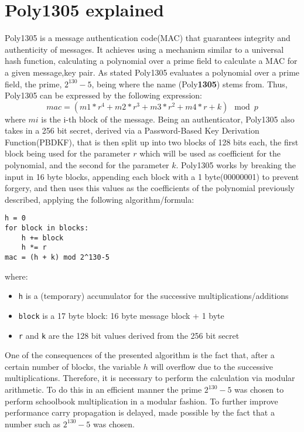 \documentclass[twocolumn]{article}
\begin{document}
\section{Poly1305 explained}
\label{poly135_101}
Poly1305 is a message authentication code(MAC) that guarantees integrity and authenticity of messages. It achieves using a mechanism similar to a universal hash function,
calculating a polynomial over a prime field to calculate a MAC for a given message,key pair. As stated Poly1305 evaluates a polynomial over a prime field, the prime, $2^{130}-5$, 
being where the name (Poly\textbf{1305}) stems from. Thus, Poly1305 can be expressed by the following expression: 
$$mac = (m1 * r^4 + m2 * r^3 + m3 * r^2 + m4 * r + k) \mod{p} $$ 
where $mi$ is the i-th block of the message. Being an authenticator, Poly1305 also takes in a 256 bit secret, derived via a Password-Based Key Derivation Function(PBDKF), 
that is then split up into two blocks of 128 bits each, the first block being used for the parameter $r$ which will be used as coefficient for the polynomial, and the second 
for the parameter $k$. Poly1305 works by breaking the input in 16 byte blocks, appending each block with a 1 byte(00000001) to prevent forgery, and then uses
this values as the coefficients of the polynomial previously described, applying the following algorithm/formula:

\begin{Verbatim}[fontsize=\footnotesize]
h = 0
for block in blocks:
    h += block
    h *= r
mac = (h + k) mod 2^130-5
\end{Verbatim}

where:
\begin{itemize}
    \item \texttt{h} is a (temporary) accumulator for the successive multiplications/additions
    \item \texttt{block} is a 17 byte block: 16 byte message block + 1 byte
    \item \texttt{r} and \texttt{k} are the 128 bit values derived from the 256 bit secret
\end{itemize}

One of the consequences of the presented algorithm is the fact that, after a certain number of blocks, the variable $h$ will overflow due to the successive multiplications.
Therefore, it is necessary to perform the calculation via modular arithmetic. To do this in an efficient manner the prime $2^{130}-5$ was chosen to perform schoolbook 
multiplication in a modular fashion. To further improve performance carry propagation is delayed, made possible by the fact that a number such as $2^{130}-5$ was chosen.
\end{document}
